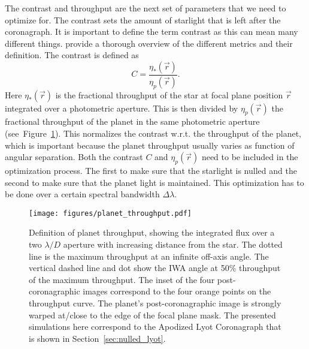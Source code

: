 \documentclass[letterpaper]{ar-1col}
\newcommand{\ld}{$\lambda/D$}
\begin{document}
The contrast and throughput are the next set of parameters that we need to optimize for.
%
The contrast sets the amount of starlight that is left after the coronagraph.
%
It is important to define the term contrast as this can mean many different things.
%
\citet{ruane2018review} provide a thorough overview of the different metrics and their definition.
%
The contrast is defined as
\begin{equation}
C = \frac{\eta_*(\vec{r})}{\eta_p(\vec{r})}.
\end{equation}
Here $\eta_*(\vec{r})$ is the fractional throughput of the star at focal plane position $\vec{r}$ integrated over a photometric aperture.
%
This is then divided by $\eta_p(\vec{r})$ the fractional throughput of the planet in the same photometric aperture (see~Figure~\ref{fig:planet_throughput}).
%
This normalizes the contrast w.r.t. the throughput of the planet, which is important because the planet throughput usually varies as function of angular separation.
%
Both the contrast $C$ and $\eta_p(\vec{r})$ need to be included in the optimization process.
%
The first to make sure that the starlight is nulled and the second to make sure that the planet light is maintained.
%
This optimization has to be done over a certain spectral bandwidth $\Delta \lambda$.

\begin{figure}[ht]
  \centering
  \texttt{[image: figures/planet\_throughput.pdf]}
  \caption{Definition of planet throughput, showing the integrated flux over a two \ld{} aperture with increasing distance from the star.
  The dotted line is the maximum throughput at an infinite off-axis angle.
  The vertical dashed line and dot show the IWA angle at 50\% throughput of the maximum throughput.
  The inset of the four post-coronagraphic images correspond to the four orange points on the throughput curve.
  The planet's post-coronagraphic image is strongly warped at/close to the edge of the focal plane mask.
  The presented simulations here correspond to the Apodized Lyot Coronagraph that is shown in Section~\ref{sec:nulled_lyot}.}
  \label{fig:planet_throughput}
\end{figure}
\end{document}
